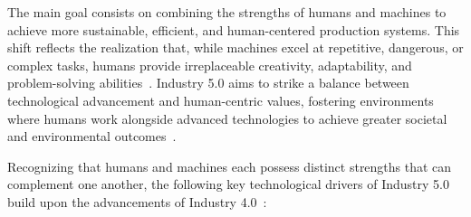 The main goal consists on combining the strengths of humans and machines to achieve more sustainable, efficient, and human-centered production systems. This shift reflects the realization that, while machines excel at repetitive, dangerous, or complex tasks, humans provide irreplaceable creativity, adaptability, and problem-solving abilities~\cite{10577684}. Industry 5.0 aims to strike a balance between technological advancement and human-centric values, fostering environments where humans work alongside advanced technologies to achieve greater societal and environmental outcomes~\cite{GOLOVIANKO2023102}.


Recognizing that humans and machines each possess distinct strengths that can complement one another, the following key technological drivers of Industry 5.0 build upon the advancements of Industry 4.0~\cite{10577684}:

